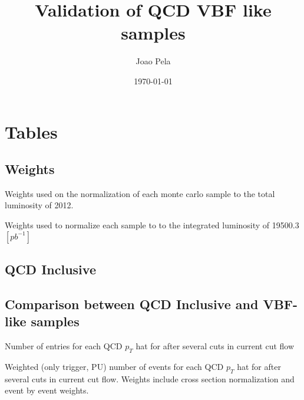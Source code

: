\documentclass[a4paper,10pt]{article}
\title{Validation of QCD VBF like samples}
\author{Joao Pela}
\date{\today}
\begin{document}
\maketitle

\section{Tables}

\subsection{Weights}

Weights used on the normalization of each monte carlo sample to the total luminosity of 2012.

\begin{table}[!h]
\centering

\caption{Weights used to normalize each sample to to the integrated luminosity of 19500.3 $[pb^{-1}]$}
\end{table}

\subsection{QCD Inclusive}

\begin{table}[!h]
\centering
\resizebox{\linewidth}{!}{}
\caption{}
\end{table}

\begin{table}[!h]
\centering

\caption{}
\end{table}

\subsection{Comparison between QCD Inclusive and VBF-like samples}

\begin{table}[!h]
\centering
\resizebox{\linewidth}{!}{}
\caption{Number of entries for each QCD $p_T$ hat for after several cuts in current cut flow}
\end{table}

\begin{table}[!h]
\centering
\resizebox{\linewidth}{!}{}
\caption{Weighted (only trigger, PU) number of events for each QCD $p_T$ hat for after several cuts in current cut flow. Weights include cross section normalization and event by event weights.}
\end{table}
\end{document}
